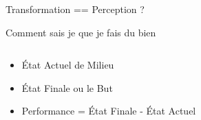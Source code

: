\documentclass{beamer}
\begin{document}
\begin{frame}{Transformation == Perception ?}
\end{frame}

\begin{frame}{Comment sais je que je fais du bien}
\begin{columns}
\begin{column}{0.6\textwidth}
\begin{block}{}

\begin{itemize}
    \item État Actuel de Milieu
    \item État Finale ou le But
    \item Performance = État Finale - État Actuel
\end{itemize}


\end{block}
\end{column}
\end{columns}
\end{frame}
\end{document}
